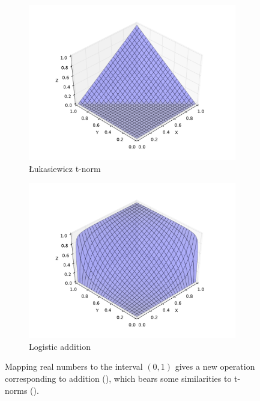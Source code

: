 \documentclass[journal,draftcls,onecolumn]{IEEEtran}
\theoremstyle{definition}
\begin{document}
\begin{figure}
  \begin{subfigure}{0.49\textwidth}
    \includegraphics[width=\textwidth]{lukasiewicz.pdf}
    \caption{\L ukasiewicz t-norm}
    \label{fig:lukasiewicz}
  \end{subfigure}
  \begin{subfigure}{0.49\textwidth}
    \includegraphics[width=\textwidth]{rieszfunc.pdf}
    \caption{Logistic addition}
    \label{fig:logistic}
  \end{subfigure}
  \caption{Mapping real numbers to the interval $(0,1)$ gives a new
    operation corresponding to addition (), which
    bears some similarities to t-norms ().}
  \label{fig:tnorm}
\end{figure}
\end{document}
